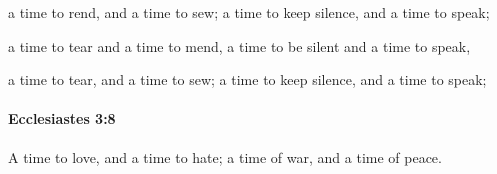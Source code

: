 			\begin{versebox}
					\item[BHS] 
					\item[LXX] 
					\item[ASV] a time to rend, and a time to sew; a time to keep silence, and a time to speak;
					\item[NIV] a time to tear and a time to mend, a time to be silent and a time to speak,
					\item[NRSV] a time to tear, and a time to sew; a time to keep silence, and a time to speak;
			\end{versebox}

		\paragraph{Ecclesiastes 3:8} %
			\label{ECCLESIASTES-3-8}

			A time to love, and a time to hate; a time of war, and a time of peace.

